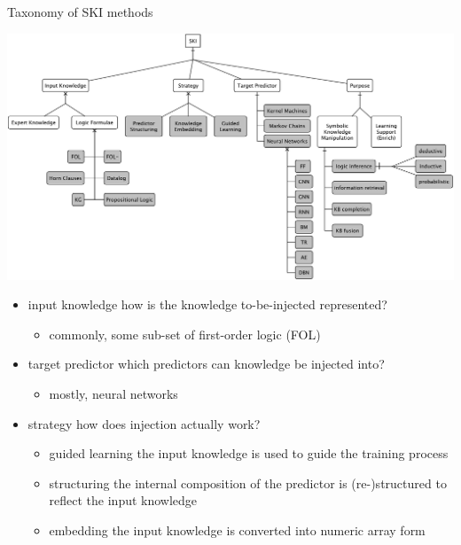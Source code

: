 \documentclass[presentation]{beamer}\mode<presentation>{\usetheme{AMSBolognaFC}}
\begin{document}
\begin{frame}[allowframebreaks]{Taxonomy of SKI methods}
    \begin{center}
        \includegraphics[width=\linewidth]{figures/ski-taxonomy.pdf}
    \end{center}
    
    \framebreak

    \begin{itemize}
        \item \alert{input knowledge} how is the knowledge to-be-injected represented?
        \begin{itemize}
            \item commonly, some sub-set of first-order logic (FOL)
        \end{itemize} 

        \item \alert{target predictor} which predictors can knowledge be injected into?
        \begin{itemize}
            \item mostly, neural networks
        \end{itemize} 

        \item \alert{strategy} how does injection actually work?
        \begin{itemize}
            \item \alert{guided learning} the input knowledge is used to \alert{guide the training} process
            \item \alert{structuring} the \alert{internal} composition of the predictor is \alert{(re-)structured} to reflect the input knowledge  
            \item \alert{embedding} the input knowledge is \alert{converted} into numeric array form
        \end{itemize} 


\end{itemize}
\end{frame}
\end{document}
